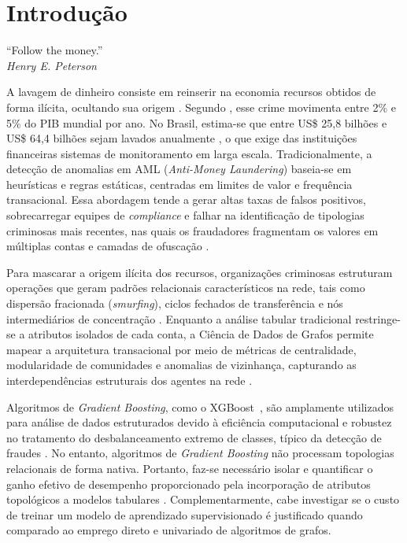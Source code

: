 \documentclass[a4paper,12pt,oneside,onecolumn,final,fleqn]{repUERJ}
\begin{document}
\sumario
\mainmatter 

\chapter{Introdução}

\begin{epigrafeonline}
\hfill ``Follow the money.''\hspace{0.2cm}\null\\
\hspace*{\fill}\textit{Henry E. Peterson}\\
\end{epigrafeonline}

A lavagem de dinheiro consiste em reinserir na economia recursos obtidos de forma ilícita, ocultando sua origem \cite{coaf2021cartilha}. Segundo , esse crime movimenta entre 2\% e 5\% do PIB mundial por ano. No Brasil, estima-se que entre US\$ 25,8 bilhões e US\$ 64,4 bilhões sejam lavados anualmente \cite{vinciworks, kar2014brazil, brasil2021nra}, o que exige das instituições financeiras sistemas de monitoramento em larga escala. Tradicionalmente, a detecção de anomalias em AML (\textit{Anti-Money Laundering}) baseia-se em heurísticas e regras estáticas, centradas em limites de valor e frequência transacional. Essa abordagem tende a gerar altas taxas de falsos positivos, sobrecarregar equipes de \textit{compliance} e falhar na identificação de tipologias criminosas mais recentes, nas quais os fraudadores fragmentam os valores em múltiplas contas e camadas de ofuscação \cite{jensen2023fighting}.

Para mascarar a origem ilícita dos recursos, organizações criminosas estruturam operações que geram padrões relacionais característicos na rede, tais como dispersão fracionada (\textit{smurfing}), ciclos fechados de transferência e nós intermediários de concentração \cite{cheng2025graph, dumitrescu2022anomaly, fatf2018concealment}. Enquanto a análise tabular tradicional restringe-se a atributos isolados de cada conta, a Ciência de Dados de Grafos permite mapear a arquitetura transacional por meio de métricas de centralidade, modularidade de comunidades e anomalias de vizinhança, capturando as interdependências estruturais dos agentes na rede \cite{baigabyl2025using}.

Algoritmos de \textit{Gradient Boosting}, como o XGBoost~\cite{chen2016xgboost}, são amplamente utilizados para análise de dados estruturados devido à eficiência computacional e robustez no tratamento do desbalanceamento extremo de classes, típico da detecção de fraudes \cite{alarab2020comparative}. No entanto, algoritmos de \textit{Gradient Boosting} não processam topologias relacionais de forma nativa. Portanto, faz-se necessário isolar e quantificar o ganho efetivo de desempenho proporcionado pela incorporação de atributos topológicos a modelos tabulares \cite{karim2024scalable}. Complementarmente, cabe investigar se o custo de treinar um modelo de aprendizado supervisionado é justificado quando comparado ao emprego direto e univariado de algoritmos de grafos.
\end{document}
